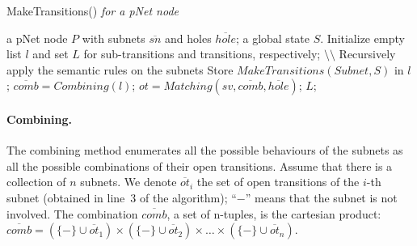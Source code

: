 \documentclass{lncs/llncs}
\newcommand{\noteSB}[2][color=green!40, size=\tiny]{\todo[#1]{{\bf
      Note: } {#2}}}
\newcommand{\noteInSB}[2][inline,color=green!40]{\todo[#1]{{\bf Simon: } {#2}}}
\begin{document}

\begin{algorithm}[h]
\caption{MakeTransitions() \em{for a pNet node}}
  \label{alg2}
\begin{algorithmic}[1]
\Require a pNet node $P$ with subnets $\overline{sn}$ and holes $\overline{hole}$; a global state $S$.
\State Initialize empty list $l$ and set $L$ for sub-transitions and transitions, respectively;
        \hfill $\setminus \setminus$ Recursively apply the semantic rules on the subnets
           \State Store $\mathit{MakeTransitions}(Subnet, S)$ in $l$;
	\EndFor
	\State $\overline{comb} = \mathit{Combining}(l)$;
           \State $ot = \mathit{Matching}(sv, \overline{\mathit{comb}}, \overline{\mathit{hole}})$;
	\EndFor
\State \Return $L$;
\end{algorithmic}  
\end{algorithm}



%
%


\def\inactive{\{-\}}
\paragraph{Combining.}
The combining method enumerates all the possible behaviours of the
subnets as all the possible combinations of their open transitions.
Assume that there is a collection of $n$ subnets.
We denote $\overline{ot}_i$ the set of open
transitions of the $i$-th
subnet (obtained in line~3 of the algorithm); %
``$-$'' means that the subnet is not involved.
The combination $\overline{comb}$, a set of n-tuples, is the
cartesian product:  
$\overline{comb} = (\inactive\cup \overline{ot}_1) \times (\inactive\cup \overline{ot}_2)\times \dots \times (\inactive\cup \overline{ot}_n)$.
\end{document}
